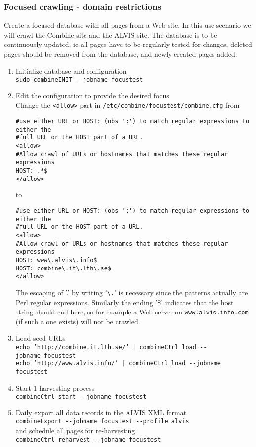 \subsubsection{Focused crawling - domain restrictions}
Create a focused database with all pages from a Web-site. In this
use scenario we will crawl the Combine site and the ALVIS site.
The database is to be continuously updated, ie all pages have to be
regularly tested for changes, deleted pages should be removed from
the database, and newly created pages added.
\begin{enumerate}
\item    Initialize database and configuration\\
{\tt  sudo combineINIT \verb+--+jobname focustest}

\item Edit the configuration to provide the desired focus\\
Change the {\tt <allow>} part in {\tt /etc/combine/focustest/combine.cfg} from\\
\begin{verbatim}
#use either URL or HOST: (obs ':') to match regular expressions to either the
#full URL or the HOST part of a URL.
<allow>
#Allow crawl of URLs or hostnames that matches these regular expressions
HOST: .*$
</allow>
\end{verbatim}
to\\
\begin{verbatim}
#use either URL or HOST: (obs ':') to match regular expressions to either the
#full URL or the HOST part of a URL.
<allow>
#Allow crawl of URLs or hostnames that matches these regular expressions
HOST: www\.alvis\.info$
HOST: combine\.it\.lth\.se$
</allow>
\end{verbatim}
The escaping of '.' by writing '\verb+\.+' is necessary since the patterns
actually are Perl regular expressions. Similarly the ending '\$'
indicates that the host string should end here, so for example
a Web server on {\tt www.alvis.info.com} (if such a one exists) will
not be crawled.

\item Load seed URLs\\
{\tt  echo 'http://combine.it.lth.se/' | combineCtrl  load \verb+--+jobname~focustest}\\
{\tt  echo 'http://www.alvis.info/' | combineCtrl  load \verb+--+jobname focustest}

\item  Start 1 harvesting process\\
{\tt  combineCtrl  start \verb+--+jobname focustest}

\item  Daily export all data records in the ALVIS XML format\\
{\tt  combineExport \verb+--+jobname focustest \verb+--+profile alvis}\\
and schedule all pages for re-harvesting\\
{\tt combineCtrl reharvest \verb+--+jobname focustest}
\end{enumerate}



